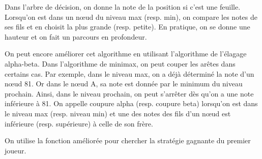 \documentclass[12pt, a4paper]{article}
\begin{document}
Dans l'arbre de décision, on donne la note de la position si c'est une feuille. Lorsqu'on est dans un nœud du niveau max (resp. min), on compare les notes de ses fils et en choisit la plus grande (resp. petite). En pratique, on se donne une hauteur et on fait un parcours en profondeur.\par
On peut encore améliorer cet algorithme en utilisant l'algorithme de l'élagage alpha-beta. Dans l'algorithme de minimax, on peut couper les arêtes dans certains cas. Par exemple, dans le niveau max, on a déjà déterminé la note d'un nœud 81. Or dans le nœud A, sa note est donnée par le minimum du niveau prochain. Ainsi, dans le niveau prochain, on peut s'arrêter dès qu'on a une note inférieure à 81. On appelle coupure alpha (resp. coupure beta) lorsqu'on est dans le niveau max (resp. niveau min) et une des notes des fils d'un nœud est inférieure (resp. supérieure) à celle de son frère.

On utilise la fonction améliorée pour chercher la stratégie gagnante du premier joueur.
\end{document}
